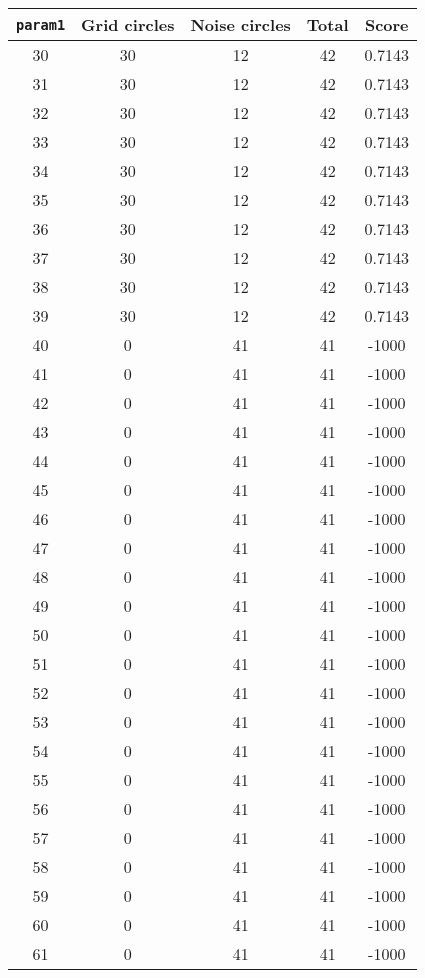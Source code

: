 \documentclass[letterpaper, 12pt]{article}
\begin{document}
\begin{longtable}{|c|c|c|c|c|}
\hline
\textbf{\texttt{param1}} & \textbf{Grid circles} & \textbf{Noise circles} & \textbf{Total} & \textbf{Score} \\
\hline
30 & 30 & 12 & 42 & 0.7143 \\
\hline
31 & 30 & 12 & 42 & 0.7143 \\
\hline
32 & 30 & 12 & 42 & 0.7143 \\
\hline
33 & 30 & 12 & 42 & 0.7143 \\
\hline
34 & 30 & 12 & 42 & 0.7143 \\
\hline
35 & 30 & 12 & 42 & 0.7143 \\
\hline
36 & 30 & 12 & 42 & 0.7143 \\
\hline
37 & 30 & 12 & 42 & 0.7143 \\
\hline
38 & 30 & 12 & 42 & 0.7143 \\
\hline
39 & 30 & 12 & 42 & 0.7143 \\
\hline
40 & 0 & 41 & 41 & -1000 \\
\hline
41 & 0 & 41 & 41 & -1000 \\
\hline
42 & 0 & 41 & 41 & -1000 \\
\hline
43 & 0 & 41 & 41 & -1000 \\
\hline
44 & 0 & 41 & 41 & -1000 \\
\hline
45 & 0 & 41 & 41 & -1000 \\
\hline
46 & 0 & 41 & 41 & -1000 \\
\hline
47 & 0 & 41 & 41 & -1000 \\
\hline
48 & 0 & 41 & 41 & -1000 \\
\hline
49 & 0 & 41 & 41 & -1000 \\
\hline
50 & 0 & 41 & 41 & -1000 \\
\hline
51 & 0 & 41 & 41 & -1000 \\
\hline
52 & 0 & 41 & 41 & -1000 \\
\hline
53 & 0 & 41 & 41 & -1000 \\
\hline
54 & 0 & 41 & 41 & -1000 \\
\hline
55 & 0 & 41 & 41 & -1000 \\
\hline
56 & 0 & 41 & 41 & -1000 \\
\hline
57 & 0 & 41 & 41 & -1000 \\
\hline
58 & 0 & 41 & 41 & -1000 \\
\hline
59 & 0 & 41 & 41 & -1000 \\
\hline
60 & 0 & 41 & 41 & -1000 \\
\hline
61 & 0 & 41 & 41 & -1000 \\

\end{longtable}
\end{document}

